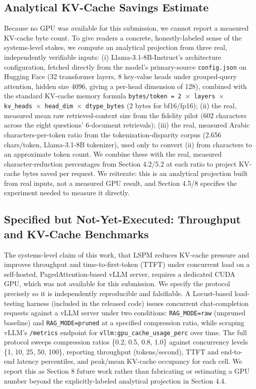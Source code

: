 \documentclass[pdflatex,sn-basic,Numbered]{sn-jnl}
\begin{document}
\subsection{Analytical KV-Cache Savings Estimate}
Because no GPU was available for this submission, we cannot report a measured KV-cache byte count. To give readers a concrete, honestly-labeled sense of the systems-level stakes, we compute an analytical projection from three real, independently verifiable inputs: (i) Llama-3.1-8B-Instruct's architecture configuration, fetched directly from the model's primary-source \texttt{config.json} on Hugging Face (32 transformer layers, 8 key-value heads under grouped-query attention, hidden size 4096, giving a per-head dimension of 128), combined with the standard KV-cache memory formula \texttt{bytes/token = 2 $\times$ layers $\times$ kv\_heads $\times$ head\_dim $\times$ dtype\_bytes} (2 bytes for bf16/fp16); (ii) the real, measured mean raw retrieved-context size from the fidelity pilot (602 characters across the eight questions' 6-document retrievals); (iii) the real, measured Arabic characters-per-token ratio from the tokenization-disparity corpus (2.656 chars/token, Llama-3.1-8B tokenizer), used only to convert (ii) from characters to an approximate token count. We combine these with the real, measured character-reduction percentages from Section 4.2/5.2 at each ratio to project KV-cache bytes saved per request. We reiterate: this is an analytical projection built from real inputs, not a measured GPU result, and Section 4.5/8 specifies the experiment needed to measure it directly.

\subsection{Specified but Not-Yet-Executed: Throughput and KV-Cache Benchmarks}
The systems-level claim of this work, that LSPM reduces KV-cache pressure and improves throughput and time-to-first-token (TTFT) under concurrent load on a self-hosted, PagedAttention-based vLLM server, requires a dedicated CUDA GPU, which was not available for this submission. We specify the protocol precisely so it is independently reproducible and falsifiable. A Locust-based load-testing harness (included in the released code) issues concurrent chat-completion requests against a vLLM server under two conditions: \texttt{RAG\_MODE=raw} (unpruned baseline) and \texttt{RAG\_MODE=pruned} at a specified compression ratio, while scraping vLLM's \texttt{/metrics} endpoint for \texttt{vllm:gpu\_cache\_usage\_perc} over time. The full protocol sweeps compression ratios \{0.2, 0.5, 0.8, 1.0\} against concurrency levels \{1, 10, 25, 50, 100\}, reporting throughput (tokens/second), TTFT and end-to-end latency percentiles, and peak/mean KV-cache occupancy for each cell. We report this as Section 8 future work rather than fabricating or estimating a GPU number beyond the explicitly-labeled analytical projection in Section 4.4.
\end{document}
